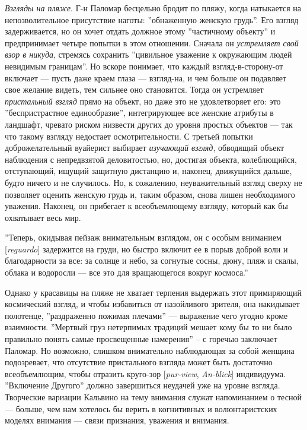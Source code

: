 \documentclass[12pt]{book}
\begin{document}
\textit{Взгляды на пляже}. Г-н Паломар бесцельно бродит по пляжу, когда натыкается на непозволительное присутствие наготы: ''обнаженную женскую грудь''. Его взгляд задерживается, но он хочет отдать должное этому ''частичному объекту'' и предпринимает четыре попытки в этом отношении. Сначала он \textit{устремляет свой взор в никуда}, стремясь сохранить ''цивильное уважение к окружающим людей невидимым границам''. Но вскоре понимает, что каждый взгляд-в-сторону-от включает --- пусть даже краем глаза --- взгляд-на, и чем больше он подавляет свое желание видеть, тем сильнее оно становится. Тогда он устремляет \textit{пристальный взгляд} прямо на объект, но даже это не удовлетворяет его: это ''беспристрастное единообразие'', интегрирующее все женские атрибуты в ландшафт, чревато риском низвести других до уровня простых объектов --- так что такому взгляду недостает осмотрительности. С третьей попытки доброжелательный вуайерист выбирает \textit{изучающий взгляд}, обводящий объект наблюдения с непредвзятой деловитостью, но, достигая объекта, колеблющийся, отступающий, ищущий защитную дистанцию и, наконец, движущийся дальше, будто ничего и не случилось. Но, к сожалению, неуважительный взгляд сверху не позволяет оценить женскую грудь и, таким образом, снова лишен необходимого уважения. Наконец, он прибегает к всеобъемлющему взгляду, который как бы охватывает весь мир.

\smallskip
{}\relax
{}\relax

''Теперь, окидывая пейзаж внимательным взглядом, он с особым вниманием [\textit{reguardo}] задержится на груди, но быстро включит ее в порыв доброй воли и благодарности за все: за солнце и небо, за согнутые сосны, дюну, пляж и скалы, облака и водоросли --- все это для вращающегося вокруг космоса.''

\relax
{}\relax
\smallskip

Однако у красавицы на пляже не хватает терпения выдержать этот примиряющий космический взгляд, и чтобы избавиться от назойливого зрителя, она накидывает полотенце, ''раздраженно пожимая плечами'' --- выражение чего угодно кроме взаимности. ''Мертвый груз нетерпимых традиций мешает кому бы то ни было правильно понять самые просвещенные намерения'' -- с горечью заключает Паломар. Но возможно, слишком внимательно наблюдающая за собой женщина подозревает, что отсутствие пристального взгляда может быть достаточно всеобъемлющим, чтобы отразить круго-зор [\textit{pur-view}, \textit{An-blick}] индивидуума. ''Включение Другого'' должно завершиться неудачей уже на уровне взгляда. Творческие вариации Кальвино на тему внимания служат напоминанием о тесной --- больше, чем нам хотелось бы верить в когнитивных и волюнтаристских моделях внимания --- связи признания, уважения и внимания.
\end{document}
